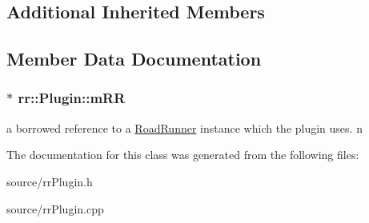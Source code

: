 \subsection*{Additional Inherited Members}


\subsection{Member Data Documentation}
\hypertarget{classrr_1_1_plugin_a285d886ef2d34534d290543db80b0f09}{
\subsubsection[{m\-R\-R}]{$\ast$ rr\-::\-Plugin\-::m\-R\-R\hspace{0.3cm}{\ttfamily [protected]}}}\label{classrr_1_1_plugin_a285d886ef2d34534d290543db80b0f09}
a borrowed reference to a \hyperlink{classrr_1_1_road_runner}{Road\-Runner} instance which the plugin uses. n 

The documentation for this class was generated from the following files\-:\begin{DoxyCompactItemize}
\item 
source/rr\-Plugin.\-h\item 
source/rr\-Plugin.\-cpp\end{DoxyCompactItemize}
